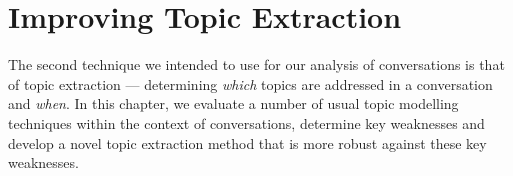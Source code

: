 \chapter[Topic Extraction]{Improving Topic Extraction}
The second technique we intended to use for our analysis of conversations is that of topic extraction --- determining \textit{which} topics are addressed in a conversation and \textit{when}. In this chapter, we evaluate a number of usual topic modelling techniques within the context of conversations, determine key weaknesses and develop a novel topic extraction method that is more robust against these key weaknesses.






\glsresetall